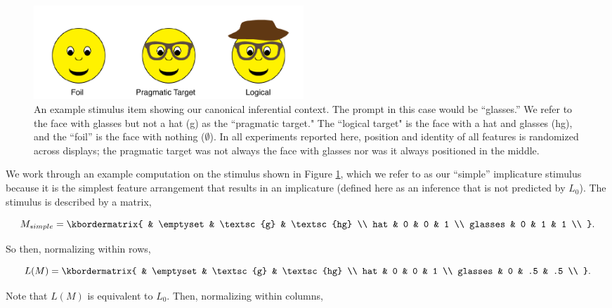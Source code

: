 \documentclass[man]{apa6}
\begin{document}
\begin{figure}[t]
  \centering
  \includegraphics[width=4in]{figures/hatglasses.pdf}
  \caption{\label{fig:ex} An example stimulus item showing our canonical inferential context. The prompt in this case would be ``glasses.'' We refer to the face with glasses but not a hat ({\sc g}) as the ``pragmatic target." The  ``logical target"  is the face with a hat and glasses ({\sc hg}), and the ``foil'' is the face with nothing ($\emptyset$). In all experiments reported here, position and identity of all features is randomized across displays; the pragmatic target was not always the face with glasses nor was it always positioned in the middle.}
\end{figure}

We work through an example computation on the stimulus shown in Figure \ref{fig:ex}, which we refer to as our ``simple'' implicature stimulus because it is the simplest feature arrangement that results in an implicature (defined here as an inference that is not predicted by $L_0$). The stimulus is described by a matrix,

\begin{equation}
  M_{simple} = \kbordermatrix{
    & \emptyset & \textsc{g} & \textsc{hg} \\
    hat & 0 & 0 & 1  \\
    glasses & 0 & 1 & 1 \\
  }.
\end{equation}

\noindent So then, normalizing within rows,


\begin{equation}
  L(M) = \kbordermatrix{
    & \emptyset & \textsc{g} & \textsc{hg} \\
    hat & 0 & 0 & 1 \\
    glasses & 0 & .5 & .5 \\
  }.
\end{equation}

\noindent Note that $L(M)$ is equivalent to $L_0$. Then, normalizing within columns,
\end{document}
